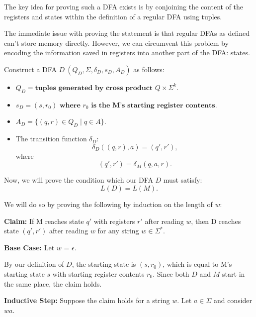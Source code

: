 \documentclass[12pt]{article}
\begin{document}
\begin{solution}
    \bbni
    
    The key idea for proving such a DFA exists is by conjoining the content of the registers and states within the definition of a regular DFA using tuples.

    The immediate issue with proving the statement is that regular DFAs as defined can't store memory directly. However, we can circumvent this problem by encoding the information saved in registers into another part of the DFA: states.
    
    Construct a DFA $D\ (Q_D, \Sigma, \delta_D, s_D, A_D)$ as follows:
    
        \begin{itemize}
            \item $Q_D = \textbf{tuples generated by cross product } Q \times \Sigma^k$.
            
            \item $s_D = (s, r_0) \textbf{ where } r_0 \textbf{ is the M's starting register contents} $.
            
            \item $A_D = \{ (q, r) \in Q_D \mid q \in A \}$.
            
            \item The transition function $\delta_D$:
            \[
            \delta_D((q, r), a) = (q', r'),
            \]
            where
            \[
            (q', r') = \delta_M(q, a, r).
            \]
        \end{itemize}
    
    
    
    Now, we will prove the condition which our DFA $D$ must satisfy:
    \[
         L(D) = L(M).
    \]
    
    We will do so by proving the following by induction on the length of $w$:
    
    \textbf{Claim:} If M reaches state $q'$ with registers $r'$ after reading $w$, then D reaches state $(q', r')$ after reading $w$ for any string $w \in \Sigma^*$.
    
    \textbf{Base Case:} Let $w$ = $\epsilon$.
    
    By our definition of $D$, the starting state is $(s, r_0)$, which is equal to M's starting state $s$ with starting register contents $r_0$. Since both $D$ and $M$ start in the same place, the claim holds.
    
    \textbf{Inductive Step:} Suppose the claim holds for a string $w$. Let $a \in \Sigma$ and consider $wa$.
    

\end{solution}
\end{document}
